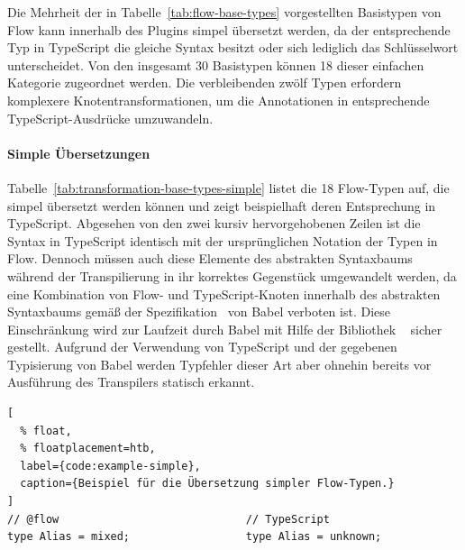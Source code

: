 Die Mehrheit der in Tabelle~\ref{tab:flow-base-types} vorgestellten Basistypen von Flow kann innerhalb des Plugins simpel übersetzt werden, da der entsprechende Typ in TypeScript die gleiche Syntax besitzt oder sich lediglich das Schlüsselwort unterscheidet. Von den insgesamt 30 Basistypen können 18 dieser einfachen Kategorie zugeordnet werden. Die verbleibenden zwölf Typen erfordern komplexere Knotentransformationen, um die Annotationen in entsprechende TypeScript-Ausdrücke umzuwandeln.

\vspace{-0.5\baselineskip}
\paragraph{Simple Übersetzungen}

Tabelle~\ref{tab:transformation-base-types-simple} listet die 18 Flow-Typen auf, die simpel übersetzt werden können und zeigt beispielhaft deren Entsprechung in TypeScript. Abgesehen von den zwei kursiv hervorgehobenen Zeilen ist die Syntax in TypeScript identisch mit der ursprünglichen Notation der Typen in Flow. Dennoch müssen auch diese Elemente des abstrakten Syntaxbaums während der Transpilierung in ihr korrektes Gegenstück umgewandelt werden, da eine Kombination von Flow- und TypeScript-Knoten innerhalb des abstrakten Syntaxbaums gemäß der Spezifikation~\autocite{BABEL:PARSER_SPEC} von Babel verboten ist. Diese Einschränkung wird zur Laufzeit durch Babel mit Hilfe der Bibliothek ~\autocite{BABEL:TYPES} sicher gestellt. Aufgrund der Verwendung von TypeScript und der gegebenen Typisierung von Babel werden Typfehler dieser Art aber ohnehin bereits vor Ausführung des Transpilers statisch erkannt.

\tablespace


\begin{lstlisting}[
  % float,
  % floatplacement=htb,
  label={code:example-simple},
  caption={Beispiel für die Übersetzung simpler Flow-Typen.}
]
// @flow                             // TypeScript
type Alias = mixed;                  type Alias = unknown;
\end{lstlisting}

